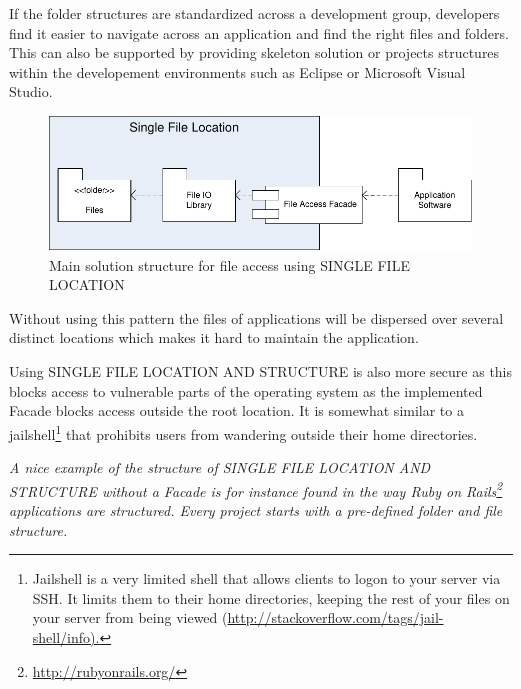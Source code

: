 If the folder structures are standardized
across a development group, developers find it easier to navigate across an application and find the right files and folders. This can also be supported by providing skeleton solution or projects structures within the developement environments such as Eclipse or Microsoft Visual Studio.

\begin{figure}[h!]
\centering
\includegraphics{patterns/singleFileLocationDiagram-02.pdf}
\caption{Main solution structure for file access using SINGLE FILE LOCATION}
\label{fig:singleFileLocationDiagram-02}
\end{figure}

Without using this pattern the files of applications will be dispersed over several distinct locations which makes it hard to maintain the application. 

Using SINGLE FILE LOCATION AND STRUCTURE is also more secure as this blocks access to vulnerable parts of the operating system as the implemented {\sc Facade} blocks access outside the root location. It is somewhat similar to a jailshell\footnote{Jailshell is a very limited shell that allows clients to logon to your server via SSH. It limits them to their home directories, keeping the rest of your files on your server from being viewed (\url{http://stackoverflow.com/tags/jail-shell/info).}} that prohibits users from wandering outside their home directories.

\textit{A nice example of the structure of SINGLE FILE LOCATION AND STRUCTURE 
without a {\sc Facade} is for instance found in the way Ruby on Rails\footnote{\url{http://rubyonrails.org/}} applications are structured. Every project starts with a pre-defined folder and file structure.}

 





